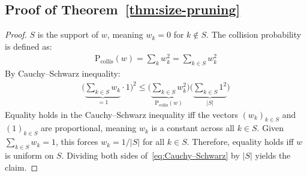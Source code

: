 \documentclass[11pt]{article}
\begin{document}
\subsection{Proof of Theorem~\ref{thm:size-pruning}}
\label{app:proof-size-bound}

\theoremsizebound*

\begin{proof}
$S$ is the support of $w$, meaning $w_k = 0$ for $k \notin S$. The collision probability is defined as:
\begin{align}
\mathrm{P}_\mathrm{collis}(w) = \sum_{k} w_k^2 = \sum_{k \in S} w_k^2
\end{align}
By Cauchy–Schwarz inequality:
\begin{align}
\big(\underbrace{\sum_{k\in S} w_k}_{=1} \cdot 1\big)^2 \le \big(\underbrace{\sum_{k\in S} w_k^2}_{\mathrm{P}_\mathrm{collis}(w)}\big) \big(\underbrace{\sum_{k\in S} 1^2}_{|S|}\big)\label{eq:Cauchy–Schwarz}
\end{align}
Equality holds in the Cauchy–Schwarz inequality iff the vectors $(w_k)_{k\in S}$ and $(1)_{k\in S}$ are proportional, meaning $w_k$ is a constant across all $k \in S$. Given $\sum_{k\in S} w_k = 1$, this forces $w_k = 1/|S|$ for all $k \in S$. Therefore, equality holds iff $w$ is uniform on $S$. 
Dividing both sides of~\eqref{eq:Cauchy–Schwarz} by $|S|$ yields the claim.
\end{proof}
\end{document}
